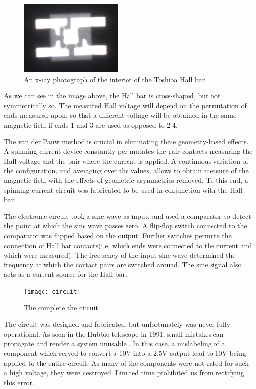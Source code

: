 \documentclass[journal,a4paper]{IEEEtran}
\begin{document}
\begin{figure}[H]
\centering
\includegraphics[width=0.45\textwidth]{hallbar}
\caption{An x-ray photograph of the interior of the Toshiba Hall bar}
\end{figure}

As we can see in the image above, the Hall bar is cross-shaped, but not symmetrically so. The measured Hall voltage will depend on the permutation of ends measured upon, so that a different voltage will be obtained in the same magnetic field if ends 1 and 3 are used as opposed to 2-4.

The van der Pauw method \cite{pauw} is crucial in eliminating these geometry-based effects. A spinning current device \cite{steiner} constantly per mutates the pair contacts measuring the Hall voltage and the pair where the current is applied. A continuous variation of the configuration, and averaging over the values, allows to obtain measure of the magnetic field with the effects of geometric asymmetries removed. To this end, a spinning current circuit was fabricated to be used in conjunction with the Hall bar.

The electronic circuit took a sine wave as input, and used a comparator to detect the point at which the sine wave passes zero. A flip-flop switch connected to the comparator was flipped based on the output. Further switches permute the connection of Hall bar contacts(i.e. which ends were connected to the current and which were measured). The frequency of the input sine wave determined the frequency at which the contact pairs are switched around. The sine signal also acts as a current source for the Hall bar. 

\begin{figure}[H]
\centering
\texttt{[image: circuit]}
\caption{The complete the circuit}
\end{figure}

The circuit was designed and fabricated, but unfortunately was never fully operational. As seen in the Hubble telescope in 1991, small mistakes can propagate and render a system unusable \cite{hubble}. In this case, a mislabeling of a component which served to convert a 10V into a 2.5V output lead to 10V being applied to the entire circuit. As many of the components were not rated for such a high voltage, they were destroyed. Limited time prohibited us from rectifying this error.
\end{document}
